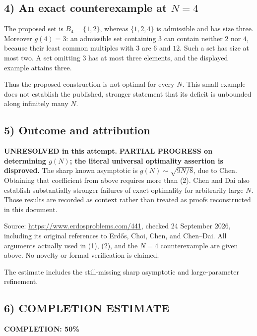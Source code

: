\subsection*{4) An exact counterexample at $N=4$}
The proposed set is $B_4=\{1,2\}$, whereas $\{1,2,4\}$ is admissible and has size three. Moreover $g(4)=3$: an admissible set containing $3$ can contain neither $2$ nor $4$, because their least common multiples with $3$ are $6$ and $12$. Such a set has size at most two. A set omitting $3$ has at most three elements, and the displayed example attains three.

Thus the proposed construction is not optimal for every $N$. This small example does not establish the published, stronger statement that its deficit is unbounded along infinitely many $N$.

\subsection*{5) Outcome and attribution}
\textbf{UNRESOLVED in this attempt.} \textbf{PARTIAL PROGRESS on determining $g(N)$; the literal universal optimality assertion is disproved.} The sharp known asymptotic is $g(N)\sim\sqrt{9N/8}$, due to Chen. Obtaining that coefficient from above requires more than (2). Chen and Dai also establish substantially stronger failures of exact optimality for arbitrarily large $N$. Those results are recorded as context rather than treated as proofs reconstructed in this document.

Source: \url{https://www.erdosproblems.com/441}, checked 24 September 2026, including its original references to Erd\H{o}s, Choi, Chen, and Chen--Dai. All arguments actually used in (1), (2), and the $N=4$ counterexample are given above. No novelty or formal verification is claimed.

The estimate includes the still-missing sharp asymptotic and large-parameter refinement.
\subsection*{6) COMPLETION ESTIMATE}
\textbf{COMPLETION: 50\%}
